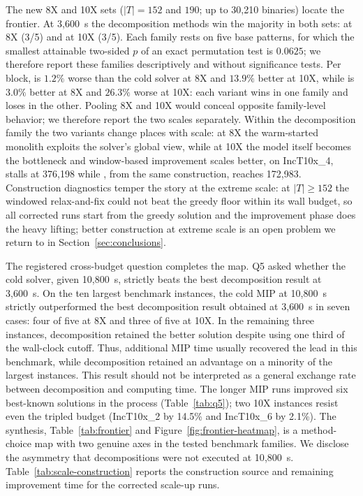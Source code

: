 The new 8X and 10X sets ($|T|=152$ and $190$; up to 30{,}210
binaries) locate the frontier. At 3{,}600~s the decomposition
methods win the majority in both sets: \RFMIP{} at 8X (3/5) and
\RFFO{} at 10X (3/5). Each family rests on five base patterns, for
which the smallest attainable two-sided $p$ of an exact permutation
test is $0.0625$; we therefore report these families descriptively
and without significance tests. Per block, \RFFO{} is $1.2\%$ worse
than the cold solver at 8X and $13.9\%$ better at 10X, while \RFMIP{}
is $3.0\%$ better at 8X and $26.3\%$ worse at 10X: each variant wins
in one family and loses in the other. Pooling 8X and 10X would
conceal opposite family-level behavior; we therefore report the two
scales separately. Within the decomposition family the two variants
change places with scale: at 8X the warm-started monolith exploits
the solver's global view, while at 10X the model itself becomes the
bottleneck and window-based improvement scales better, on
IncT10x\_4, \RFMIP{} stalls at 376{,}198 while \RFFO{}, from the
same construction, reaches 172{,}983. Construction diagnostics
temper the story at the extreme scale: at $|T|\ge 152$ the windowed
relax-and-fix could not beat the greedy floor within its wall
budget, so all corrected runs start from the greedy solution and
the improvement phase does the heavy lifting; better construction
at extreme scale is an open problem we return to in
Section~\ref{sec:conclusions}.

The registered cross-budget question completes the map. Q5 asked
whether the cold solver, given 10{,}800~s, strictly beats the best
decomposition result at 3{,}600~s. On the ten largest benchmark
instances, the cold MIP at 10{,}800~s strictly outperformed the best
decomposition result obtained at 3{,}600~s in seven cases: four of
five at 8X and three of five at 10X. In the remaining three
instances, decomposition retained the better solution despite using
one third of the wall-clock cutoff. Thus, additional MIP time usually
recovered the lead in this benchmark, while decomposition retained an
advantage on a minority of the largest instances. This result should
not be interpreted as a general exchange rate between decomposition
and computing time. The longer MIP runs improved six best-known
solutions in the process (Table~\ref{tab:q5}); two 10X instances
resist even the tripled budget (IncT10x\_2 by 14.5\% and IncT10x\_6 by
2.1\%). The synthesis, Table~\ref{tab:frontier} and
Figure~\ref{fig:frontier-heatmap}, is a method-choice map with two
genuine axes in the tested benchmark families.
We disclose the asymmetry that decompositions were not executed at
10{,}800~s.
Table~\ref{tab:scale-construction} reports the construction source and
remaining improvement time for the corrected scale-up runs.

